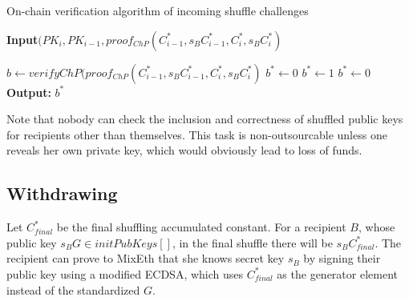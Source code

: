 \documentclass[conference, compsoc]{IEEEtran}
\theoremstyle{definition}
\begin{document}
\begin{algorithm}
	\caption{On-chain verification algorithm of incoming shuffle challenges}\label{verifyingshufflingoffchain}
	\hspace*{\algorithmicindent} \textbf{Input}$(PK_{i}, PK_{i-1}, proof_{ChP}(C^{*}_{i-1},s_{B}C^{*}_{i-1},C^{*}_{i},s_{B}C^{*}_{i})$ \\
	\begin{algorithmic}[1]
		\State $b\leftarrow verifyChP(proof_{ChP}(C^{*}_{i-1},s_{B}C^{*}_{i-1}, C^{*}_{i},s_{B}C^{*}_{i})$ 
		\State $b^*\leftarrow0$
		\State $b^*\gets 1$
		\Else
		\State $b^*\gets 0$
		\EndIf
		\hspace*{\algorithmicindent} \textbf{Output:} $b^{*}$ 
	\end{algorithmic}   
\end{algorithm}
Note that nobody can check the inclusion and correctness of shuffled public keys for recipients other than themselves. This task is non-outsourcable unless one reveals her own private key, which would obviously lead to loss of funds.

\subsection{Withdrawing}
Let $C^*_{final}$ be the final shuffling accumulated constant. For a recipient $B$, whose public key $s_{B}G \in initPubKeys[]$, in the final shuffle there will be $s_{B}C^*_{final}$. The recipient can prove to MixEth that she knows secret key $s_{B}$ by signing their public key using a modified ECDSA, which uses $C^*_{final}$ as the generator element instead of the standardized $G$.
\end{document}

